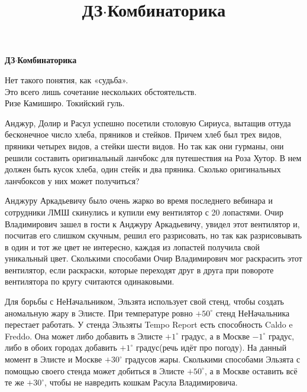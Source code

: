 \centerline{\bf \Huge ДЗ$\cdot$Комбинаторика}
\title{ДЗ$\cdot$Комбинаторика}

\begin{flushright}
    \scriptsize Нет такого понятия, как «судьба». \\Это всего лишь сочетание нескольких обстоятельств.\\
    Ризе Камиширо. Токийский гуль.
\end{flushright}
 Анджур, Долир и Расул успешно посетили столовую Сириуса, вытащив оттуда бесконечное число хлеба, пряников и стейков. Причем хлеб был трех видов, пряники четырех видов, а стейки шести видов. Но так как они гурманы, они решили составить оригинальный ланчбокс для путешествия на Роза Хутор. В нем должен быть кусок хлеба, один стейк и два пряника. Сколько оригинальных ланчбоксов у них может получиться?

 Анджуру Аркадьевичу было очень жарко во время последнего вебинара и сотрудники ЛМШ скинулись и купили ему вентилятор с 20 лопастями. Очир Владимирович зашел в гости к Анджуру Аркадьевичу, увидел этот вентилятор и, посчитав его слишком скучным, решил его разрисовать, но так как разрисовывать в один и тот же цвет не интересно, каждая из лопастей получила свой уникальный цвет. Сколькими способами Очир Владимирович мог раскрасить этот вентилятор, если раскраски, которые переходят друг в друга при повороте вентилятора по кругу считаются одинаковыми. 

Для борьбы с НеНачальником, Эльзята использует свой стенд, чтобы создать аномальную жару в Элисте. При температуре ровно $+50^{\circ}$ стенд НеНачальника перестает работать. У стенда Эльзяты Tempo Report есть способность Caldo e Freddo. Она может либо добавить в Элисте $+1^{\circ}$ градус, а в Москве $-1^{\circ}$ градус, либо в обоих городах добавить $+1^{\circ}$ градус(речь идёт про погоду). На данный момент в Элисте и Москве $+30^{\circ}$ градусов жары. Сколькими способами Эльзята с помощью своего стенда может добиться в Элисте $+50^{\circ}$, а в Москве оставить всё те же $+30^{\circ}$, чтобы не навредить кошкам Расула Владимировича.